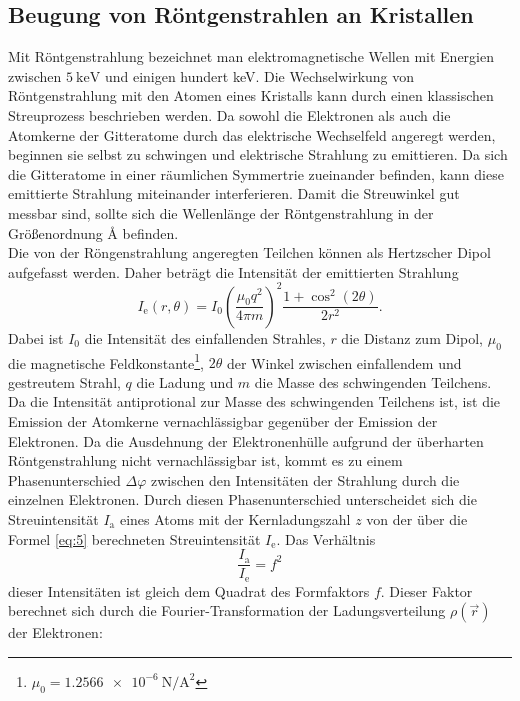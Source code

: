 \subsection{Beugung von Röntgenstrahlen an Kristallen}
\label{sec:Beugung}
Mit Röntgenstrahlung bezeichnet man elektromagnetische Wellen mit Energien zwischen $\SI{5}{\kilo\electronvolt}$
und einigen hundert \si{\kilo\electronvolt}.
Die Wechselwirkung von Röntgenstrahlung mit den Atomen eines Kristalls kann durch einen klassischen Streuprozess beschrieben werden.
Da sowohl die Elektronen als auch die Atomkerne der Gitteratome durch das elektrische Wechselfeld  angeregt werden, beginnen sie selbst zu schwingen und elektrische Strahlung zu emittieren.
Da sich die Gitteratome in einer räumlichen Symmertrie zueinander befinden, kann diese emittierte Strahlung miteinander interferieren.
Damit die Streuwinkel gut messbar sind, sollte sich die Wellenlänge der Röntgenstrahlung in der Größenordnung \si{\angstrom} befinden.\\
Die von der Röngenstrahlung angeregten Teilchen können als Hertzscher Dipol aufgefasst werden.
Daher beträgt die Intensität der emittierten Strahlung
\begin{equation}
  \label{eq:5}
I_\text{e}(r,\theta)=I_0\left(\frac{\mu_0 q^2}{4\pi m}\right)^2\frac{1+\cos^2(2\theta)}{2r^2}.
\end{equation}
Dabei ist $I_0$ die Intensität des einfallenden Strahles, $r$ die Distanz zum Dipol, $\mu_0$  die magnetische Feldkonstante\footnote{$\mu_0=\SI{1,2566e-6}{\newton\per\square\ampere}$}, $2\theta$ der Winkel zwischen einfallendem und gestreutem Strahl, $q$ die Ladung und $m$ die Masse des schwingenden Teilchens.
Da die Intensität antiprotional zur Masse des schwingenden Teilchens ist, ist die Emission der Atomkerne vernachlässigbar gegenüber der Emission der Elektronen.
Da die Ausdehnung der Elektronenhülle aufgrund der überharten Röntgenstrahlung nicht vernachlässigbar ist, kommt es zu einem Phasenunterschied $\Delta \varphi$ zwischen den Intensitäten der Strahlung durch die einzelnen Elektronen.
Durch diesen Phasenunterschied unterscheidet sich die  Streuintensität $I_\text{a}$ eines Atoms mit der Kernladungszahl $z$ von der über die Formel \ref{eq:5} berechneten Streuintensität $I_\text{e}$.
Das Verhältnis
\begin{equation}
  \frac{I_\text{a}}{I_\text{e}}=f^2
\end{equation}
dieser Intensitäten ist gleich dem Quadrat des Formfaktors $f$. Dieser Faktor berechnet sich durch die Fourier-Transformation der Ladungsverteilung $\rho(\vec r)$ der Elektronen:
